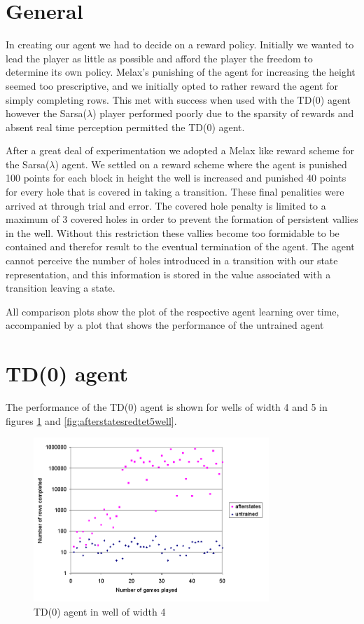 \documentclass{rucsthesis}
\begin{document}
\section{General}

In creating our agent we had to decide on a reward policy. Initially we wanted to lead the player as little as possible and afford the player the freedom to determine its own policy. Melax's punishing of the agent for increasing the height seemed too prescriptive, and we initially opted to rather reward the agent for simply completing rows. This met with success when used with the TD(0) agent however the Sarsa($\lambda$) player performed poorly due to the sparsity of rewards and absent real time perception permitted the TD(0) agent.

After a great deal of experimentation we adopted a  Melax like reward scheme for the Sarsa($\lambda$) agent. We settled on a reward scheme where the agent is punished 100 points for each block in height the well is increased and punished 40 points for every hole that is covered in taking a transition. These final penalities were arrived at through trial and error. The covered hole penalty is limited to a maximum of 3 covered holes in order to prevent the formation of persistent vallies in the well. Without this restriction these vallies become too formidable to be contained and therefor result to the eventual termination of the agent.  The agent cannot perceive the number of holes introduced in a transition with our state representation, and this information is stored in the value associated with a transition leaving a state.

All comparison plots show the plot of the respective agent learning over time, accompanied by a plot that shows the performance of the untrained agent

\section{TD(0) agent}

The performance of the TD(0) agent is shown for wells of width 4 and 5 in figures \ref{fig:afterstatesredtet4well} and \ref{fig:afterstatesredtet5well}.

\begin{figure}[h]
\centering
\includegraphics[width=3.5in]{afterstatesredtet4well.png}
\caption{TD(0) agent in well of width 4}
\label{fig:afterstatesredtet4well}
\end{figure}
\end{document}
